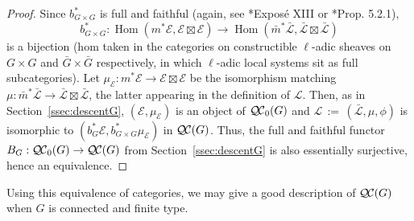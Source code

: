 \documentclass[10pt]{amsart}
\theoremstyle{plain}
\theoremstyle{definition}
\theoremstyle{remark}
\DeclareMathOperator{\Hom}{Hom}
\newcommand{\ceq}{{\, :=\, }}
\newcommand{\qcs}[1]{{\mathcal{#1}}}
\newcommand{\gqcs}[1]{{\mathcal{\bar #1}}}
\newcommand{\QC}{{\mathcal{Q\hskip-0.8pt C}}}
\newcommand{\bQC}{{\QC_0}}
\begin{document}
\begin{proof}
  Since $b_{G\times G}^*$ is full and faithful (again, see
\cite{deligne-katz:SGA7.2}*{Expos\'e XIII} or \cite{beilinson-bernstein-deligne:81a}*{Prop. 5.2.1}),
 \[
  b_{G\times G}^* : \Hom(m^*\qcs{E},\qcs{E}\boxtimes\qcs{E}) \to \Hom({\bar m}^*\gqcs{L},\gqcs{L}\boxtimes\gqcs{L})
 \]
  is a bijection
  (hom taken in the categories on constructible $\ell$-adic sheaves on
  $G\times G$ and ${\bar G}\times {\bar G}$ respectively,
  in which $\ell$-adic local systems sit as full subcategories).
  Let $\mu_\qcs{E} : m^*\qcs{E} \to \qcs{E}\boxtimes\qcs{E}$ be the isomorphism matching
  $\mu : {\bar m}^*\gqcs{L} \to \gqcs{L}\boxtimes\gqcs{L}$,
  the latter appearing in the definition of $\qcs{L}$.
  Then, as in Section~\ref{ssec:descentG}, $(\qcs{E},\mu_\qcs{E})$ is an object of $\bQC(G)$
  and $\qcs{L} \ceq (\gqcs{L},\mu,\phi)$ is isomorphic to $(b_G^*\qcs{E},b_{G\times G}^*\mu_\qcs{E})$ in $\QC(G)$.
  Thus, the full and faithful functor $B_G : \bQC(G) \to \QC(G)$ from Section~\ref{ssec:descentG}
  is also essentially surjective, hence an equivalence.
\end{proof}

Using this equivalence of categories, we may give a good description of $\QC(G)$ when $G$ is connected and finite type.
\end{document}
